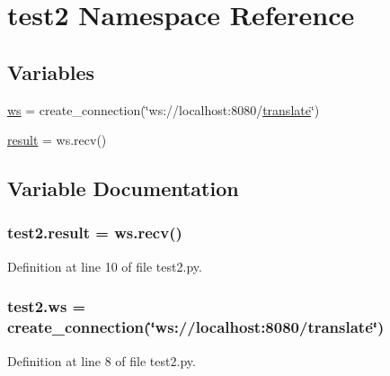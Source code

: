 \hypertarget{namespacetest2}{}\section{test2 Namespace Reference}
\label{namespacetest2}
\subsection*{Variables}
\begin{DoxyCompactItemize}
\item 
\hyperlink{namespacetest2_a1f9cdab6079833d1798cb709f6cd362d}{ws} = create\+\_\+connection(\char`\"{}ws\+://localhost\+:8080/\hyperlink{amunmt_8cpp_a86ebd9110196f3b5328ad3c3d31cd007}{translate}\char`\"{})
\item 
\hyperlink{namespacetest2_a05591d1f1584c3b3d1490fc9ac7519a6}{result} = ws.\+recv()
\end{DoxyCompactItemize}


\subsection{Variable Documentation}
\subsubsection[{\texorpdfstring{result}{result}}]{\setlength{\rightskip}{0pt plus 5cm}test2.\+result = ws.\+recv()}\hypertarget{namespacetest2_a05591d1f1584c3b3d1490fc9ac7519a6}{}\label{namespacetest2_a05591d1f1584c3b3d1490fc9ac7519a6}


Definition at line 10 of file test2.\+py.

\subsubsection[{\texorpdfstring{ws}{ws}}]{\setlength{\rightskip}{0pt plus 5cm}test2.\+ws = create\+\_\+connection(\char`\"{}ws\+://localhost\+:8080/{\bf translate}\char`\"{})}\hypertarget{namespacetest2_a1f9cdab6079833d1798cb709f6cd362d}{}\label{namespacetest2_a1f9cdab6079833d1798cb709f6cd362d}


Definition at line 8 of file test2.\+py.

